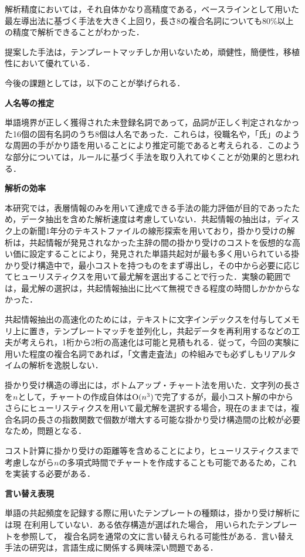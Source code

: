 解析精度においては，それ自体かなり高精度である，ベースラインとして用いた最左導出法に基づく手法を大きく上回り，長さ8の複合名詞についても80\%以上の精度で解析できることがわかった．

提案した手法は，テンプレートマッチしか用いないため，頑健性，簡便性，移植性において優れている．

今後の課題としては，以下のことが挙げられる．

\noindent
{\bf 人名等の推定}

単語境界が正しく獲得された未登録名詞であって，品詞が正しく判定されなかった16個の固有名詞のうち8個は人名であった．これらは，役職名や，「氏」のような周囲の手がかり語を用いることにより推定可能であると考えられる．このような部分については，ルールに基づく手法を取り入れてゆくことが効果的と思われる．

\noindent
{\bf 解析の効率}

本研究では，表層情報のみを用いて達成できる手法の能力評価が目的であったため，データ抽出を含めた解析速度は考慮していない．共起情報の抽出は，ディスク上の新聞1年分のテキストファイルの線形探索を用いており，掛かり受けの解析は，共起情報が発見されなかった主辞の間の掛かり受けのコストを仮想的な高い価に設定することにより，発見された単語共起対が最も多く用いられている掛かり受け構造中で，最小コストを持つものをまず導出し，その中から必要に応じてヒューリスティクスを用いて最尤解を選出することで行った．実験の範囲では，最尤解の選択は，共起情報抽出に比べて無視できる程度の時間しかかからなかった．

共起情報抽出の高速化のためには，テキストに文字インデックスを付与してメモリ上に置き，テンプレートマッチを並列化し，共起データを再利用するなどの工夫が考えられ，1桁から2桁の高速化は可能と見積もれる．従って，今回の実験に用いた程度の複合名詞であれば，「文書走査法」の枠組みでも必ずしもリアルタイムの解析を逸脱しない．

掛かり受け構造の導出には，ボトムアップ・チャート法を用いた．文字列の長さを$n$として，チャートの作成自体は${\rm O}(n^3)$で完了するが，最小コスト解の中からさらにヒューリスティクスを用いて最尤解を選択する場合，現在のままでは，複合名詞の長さの指数関数で個数が増大する可能な掛かり受け構造間の比較が必要なため，問題となる．

コスト計算に掛かり受けの距離等を含めることにより，ヒューリスティクスまで考慮しながら$n$の多項式時間でチャートを作成することも可能であるため，これを実装する必要がある．

\noindent
{\bf 言い替え表現}

単語の共起頻度を記録する際に用いたテンプレートの種類は，掛かり受け解析には現
在利用していない．ある依存構造が選ばれた場合，
用いられたテンプレートを参照して，
複合名詞を通常の文に言い替えられる可能性がある．言い替え手法の研究は，言語生成に関係する興味深い問題である．　

